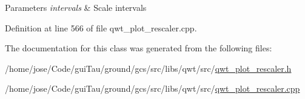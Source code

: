 \begin{DoxyParams}{Parameters}
{\em intervals} & Scale intervals \\
\hline
\end{DoxyParams}


Definition at line 566 of file qwt\-\_\-plot\-\_\-rescaler.\-cpp.



The documentation for this class was generated from the following files\-:\begin{DoxyCompactItemize}
\item 
/home/jose/\-Code/gui\-Tau/ground/gcs/src/libs/qwt/src/\hyperlink{qwt__plot__rescaler_8h}{qwt\-\_\-plot\-\_\-rescaler.\-h}\item 
/home/jose/\-Code/gui\-Tau/ground/gcs/src/libs/qwt/src/\hyperlink{qwt__plot__rescaler_8cpp}{qwt\-\_\-plot\-\_\-rescaler.\-cpp}\end{DoxyCompactItemize}
